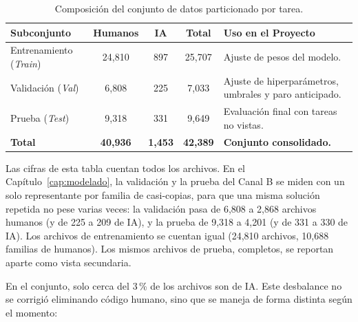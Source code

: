 \begin{table}[H]
    \centering
    \caption{Composición del conjunto de datos particionado por tarea.}
    \label{tab:particion_corpus}
    \begin{tabularx}{\textwidth}{|l|c|c|c|X|}
        \hline
        \textbf{Subconjunto} & \textbf{Humanos} & \textbf{IA} & \textbf{Total} & \textbf{Uso en el Proyecto} \\ \hline
        Entrenamiento (\textit{Train}) & 24,810 & 897 & 25,707 & Ajuste de pesos del modelo. \\ \hline
        Validación (\textit{Val}) & 6,808 & 225 & 7,033 & Ajuste de hiperparámetros, umbrales y paro anticipado. \\ \hline
        Prueba (\textit{Test}) & 9,318 & 331 & 9,649 & Evaluación final con tareas no vistas. \\ \hline
        \hline
        \textbf{Total} & \textbf{40,936} & \textbf{1,453} & \textbf{42,389} & \textbf{Conjunto consolidado.} \\ \hline
    \end{tabularx}
\end{table}

Las cifras de esta tabla cuentan todos los archivos. En el Capítulo~\ref{cap:modelado}, la validación y la prueba del Canal B se miden con un solo representante por familia de casi-copias, para que una misma solución repetida no pese varias veces: la validación pasa de 6,808 a 2,868 archivos humanos (y de 225 a 209 de IA), y la prueba de 9,318 a 4,201 (y de 331 a 330 de IA). Los archivos de entrenamiento se cuentan igual (24,810 archivos, 10,688 familias de humanos). Los mismos archivos de prueba, completos, se reportan aparte como vista secundaria.

En el conjunto, solo cerca del 3\,\% de los archivos son de IA. Este desbalance no se corrigió eliminando código humano, sino que se maneja de forma distinta según el momento:


